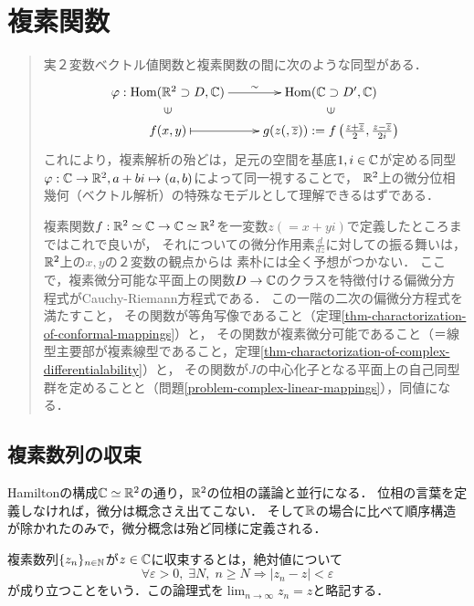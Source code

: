 \documentclass[uplatex, dvipdfmx]{jsreport}
\begin{document}
\chapter{複素関数}

\begin{quotation}
    実２変数ベクトル値関数と複素関数の間に次のような同型がある．
    \[\xymatrix@R-2pc{
        \varphi:\Hom(\R^2\supset D,\C)\ar[r]^-{\sim}&\Hom(\C\supset D',\C)\\
        \rotatebox{90}{$\in$}&\rotatebox{90}{$\in$}\\
        {f(x,y)}\ar@{|->}[r]&g(z(,\overline{z})):=f\left(\frac{z+\overline{z}}{2},\frac{z-\overline{z}}{2i}\right)
    }\]
    これにより，複素解析の殆どは，足元の空間を基底$1,i\in\mathbb{C}$が定める同型$\varphi:\mathbb{C}\to\mathbb{R}^2,a+bi\mapsto (a,b)$によって同一視することで，
    $\mathbb{R}^2$上の微分位相幾何（ベクトル解析）の特殊なモデルとして理解できるはずである．

    複素関数$f:\mathbb{R}^2\simeq\mathbb{C}\to\mathbb{C}\simeq\mathbb{R}^2$を一変数$z(=x+yi)$で定義したところまではこれで良いが，
    それについての微分作用素$\frac{d}{dz}$に対しての振る舞いは，$\mathbb{R}^2$上の$x,y$の２変数の観点からは
    素朴には全く予想がつかない．
    ここで，複素微分可能な平面上の関数$D\to\mathbb{C}$のクラスを特徴付ける偏微分方程式がCauchy-Riemann方程式である．
    この一階の二次の偏微分方程式を満たすこと，
    その関数が等角写像であること（定理\ref{thm-charactorization-of-conformal-mappings}）と，
    その関数が複素微分可能であること（＝線型主要部が複素線型であること，定理\ref{thm-charactorization-of-complex-differentialability}）と，
    その関数が$J$の中心化子となる平面上の自己同型群を定めることと（問題\ref{problem-complex-linear-mappings}），同値になる．
\end{quotation}

\section{複素数列の収束}

\begin{screen}
    Hamiltonの構成$\mathbb{C}\simeq\mathbb{R}^2$の通り，$\mathbb{R}^2$の位相の議論と並行になる．
    位相の言葉を定義しなければ，微分は概念さえ出てこない．
    そして$\mathbb{R}$の場合に比べて順序構造が除かれたのみで，微分概念は殆ど同様に定義される．
\end{screen}

\begin{definition}[convergence]
    複素数列$\{z_n\}_{n\in\mathbb{N}}$が$z\in\mathbb{C}$に収束するとは，絶対値について
    \[ \forall\varepsilon>0,\;\exists N,\;n\ge N\Rightarrow |z_n-z|<\varepsilon \]
    が成り立つことをいう．この論理式を$\lim_{n\to\infty}z_n=z$と略記する．
\end{definition}
\end{document}
